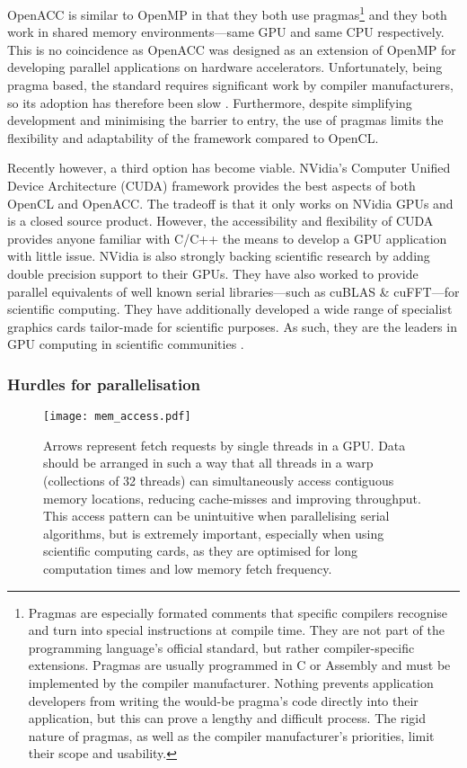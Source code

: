 OpenACC is similar to OpenMP in that they both use pragmas\footnote{Pragmas are especially formated comments that specific compilers recognise and turn into special instructions at compile time. They are not part of the programming language's official standard, but rather compiler-specific extensions. Pragmas are usually programmed in C or Assembly and must be implemented by the compiler manufacturer. Nothing prevents application developers from writing the would-be pragma's code directly into their application, but this can prove a lengthy and difficult process. The rigid nature of pragmas, as well as the compiler manufacturer's priorities, limit their scope and usability.} and they both work in shared memory environments---same GPU and same CPU respectively. This is no coincidence as OpenACC was designed as an extension of OpenMP for developing parallel applications on hardware accelerators. Unfortunately, being pragma based, the standard requires significant work by compiler manufacturers, so its adoption has therefore been slow \cite{openacc}. Furthermore, despite simplifying development and minimising the barrier to entry, the use of pragmas limits the flexibility and adaptability of the framework compared to OpenCL.

Recently however, a third option has become viable. NVidia's Computer Unified Device Architecture (CUDA) framework provides the best aspects of both OpenCL and OpenACC. The tradeoff is that it only works on NVidia GPUs and is a closed source product. However, the accessibility and flexibility of CUDA provides anyone familiar with C/C++ the means to develop a GPU application with little issue. NVidia is also strongly backing scientific research by adding double precision support to their GPUs. They have also worked to provide parallel equivalents of well known serial libraries---such as cuBLAS \& cuFFT---for scientific computing. They have additionally developed a wide range of specialist graphics cards tailor-made for scientific purposes. As such, they are the leaders in GPU computing in scientific communities \cite{nvidia}.

\subsubsection{Hurdles for parallelisation}
\label{sc:hurdpara}

\begin{figure}
  \centering
  \texttt{[image: mem\_access.pdf]}
  \caption[Memory access pattern example.]{Arrows represent fetch requests by single threads in a GPU. Data should be arranged in such a way that all threads in a warp (collections of 32 threads) can simultaneously access contiguous memory locations, reducing cache-misses and improving throughput. This access pattern can be unintuitive when parallelising serial algorithms, but is extremely important, especially when using scientific computing cards, as they are optimised for long computation times and low memory fetch frequency.}
  \label{f:mem_accessIntro}
\end{figure}

